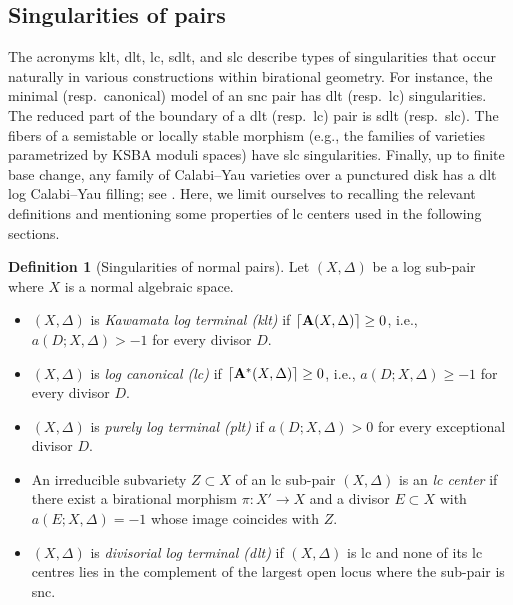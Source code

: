 \documentclass{amsart}
\theoremstyle{definition}
\newtheorem{defn}[theorem]{Definition}
\theoremstyle{remark}
\newcommand\bfA{{\bf A}}
\numberwithin{equation}{section}
\begin{document}
\subsection{Singularities of pairs} The acronyms klt, dlt, lc, sdlt, and slc describe types of singularities that occur naturally in various constructions within birational geometry.
For instance, the minimal (resp.~canonical) model of an snc pair has dlt (resp.~lc) singularities. The reduced part of the boundary of a dlt (resp.~lc) pair is sdlt (resp.~slc). The fibers of a semistable or locally stable morphism (e.g., the families of varieties parametrized by KSBA moduli spaces) have slc singularities. Finally, up to finite base change, any family of Calabi--Yau varieties over a punctured disk has a dlt log Calabi--Yau filling; see \cite{Fujino2011}. Here, we limit ourselves to recalling the relevant definitions and mentioning some properties of 
lc centers used in the following sections.  
\begin{defn}[Singularities of normal pairs]
Let $(X, \Delta)$ be a log sub-pair where $X$ is a normal algebraic space.
\begin{itemize}
\item $(X, \Delta)$ is 
\emph{Kawamata log terminal (klt)} if $\lceil \bfA(X, \Delta) \rceil \geq 0$, i.e., $a(D; X, \Delta) > -1$ for every divisor $D$. 
\item $(X, \Delta)$ is 
\emph{log canonical (lc)} if $\lceil \bfA^*(X, \Delta) \rceil \geq 0$, i.e., $a(D; X, \Delta) \geq -1$ for every divisor $D$.
\item $(X, \Delta)$ is 
\emph{purely log terminal (plt)} if $a(D; X, \Delta) > 0$ for every exceptional divisor $D$.
\item An irreducible
subvariety $Z \subset X$ of an lc sub-pair $(X, \Delta)$ is an \emph{lc center} if there exist a birational morphism $\pi \colon X' \to X$
and a divisor $E \subset X$ with $a(E; X, \Delta) =-1$ 
whose image coincides with $Z$. 
\item $(X, \Delta)$ is \emph{divisorial log terminal (dlt)} if $(X, \Delta)$ is lc and none of
its lc centres lies in the complement of the largest open locus where the sub-pair is snc. 
\end{itemize}
\end{defn}
\end{document}
